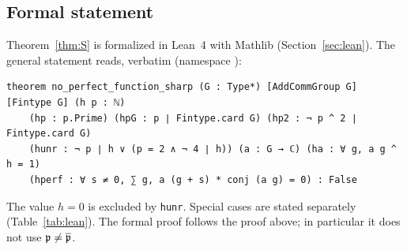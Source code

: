 \subsection{Formal statement}\label{ssec:formal}
Theorem~\ref{thm:S} is formalized in Lean~4 with Mathlib
(Section~\ref{sec:lean}). The general statement reads, verbatim (namespace
):
\begin{Verbatim}[fontsize=\footnotesize]
theorem no_perfect_function_sharp (G : Type*) [AddCommGroup G] [Fintype G] (h p : ℕ)
    (hp : p.Prime) (hpG : p ∣ Fintype.card G) (hp2 : ¬ p ^ 2 ∣ Fintype.card G)
    (hunr : ¬ p ∣ h ∨ (p = 2 ∧ ¬ 4 ∣ h)) (a : G → ℂ) (ha : ∀ g, a g ^ h = 1)
    (hperf : ∀ s ≠ 0, ∑ g, a (g + s) * conj (a g) = 0) : False
\end{Verbatim}
\noindent The value $h=0$ is excluded by \texttt{hunr}. Special cases are
stated separately (Table~\ref{tab:lean}). The formal proof follows the
proof above; in particular it does not use $\mathfrak{p}\ne\overline{\mathfrak{p}}$.
